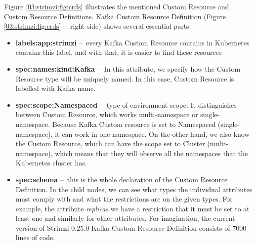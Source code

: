 Figure \ref{03:strimzi:fig:crds} illustrates the mentioned Custom Resource and Custom Resource Definitions. Kafka Custom Resource Definition (Figure \ref{03:strimzi:fig:crds} \---\ right side) shows several essential parts:
\begin{itemize}[itemsep=1mm, parsep=0pt]
    \item \textbf{labels:app:strimzi}  \---\ every Kafka Custom Resource contains in Kubernetes contains this label, and with that, it is easier to find these resources
    \item \textbf{spec:names:kind:Kafka} \---\ In this attribute, we specify how the Custom Resource type will be uniquely named. In this case, Custom Resource is labelled with Kafka name.
    \item \textbf{spec:scope:Namespaced} \---\ type of environment scope. It distinguishes between Custom Resource, which works multi-namespace or single-namespace. Because Kafka Custom resource is set to Namespaced (single-namespace), it can work in one namespace. On the other hand, we also know the Custom Resource, which can have the scope set to Cluster (multi-namespace), which means that they will observe all the namespaces that the Kubernetes cluster has. 
    \item \textbf{spec:schema} \---\ this is the whole declaration of the Custom Resource Definition. In the child nodes, we can see what types the individual attributes must comply with and what the restrictions are on the given types. For example, the attribute \emph{replicas} we have a restriction that it must be set to at least one and similarly for other attributes. For imagination, the current version of Strimzi 0.25.0 Kafka Custom Resource Definition consists of 7000 lines of code.
\end{itemize}

